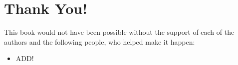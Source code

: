 \section*{Thank You!}

This book would not have been possible without the support of each of the
authors and the following people, who helped make it happen:
\begin{itemize}
 \item ADD! 
\end{itemize}

\newpage
